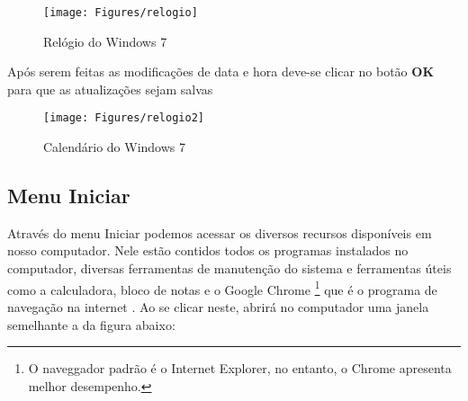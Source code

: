\documentclass[12pt]{article}
\begin{document}
	\begin{figure}[!hb]
		\centering
		\texttt{[image: Figures/relogio]}
		\caption{Relógio do Windows 7}
		\label{fig:relogio}
		
	\end{figure}
	
	Após serem feitas as modificações de data e hora deve-se clicar no botão {\bf OK} para que as atualizações sejam salvas
	
	\begin{figure}[!h]
		\centering
		\texttt{[image: Figures/relogio2]}
		\caption{Calendário do Windows 7}
		\label{fig:calendario}
		
	\end{figure}
	
	\newpage
	\subsection{Menu Iniciar}
	
	Através do menu Iniciar podemos acessar os diversos recursos disponíveis em nosso computador. Nele estão contidos todos os programas instalados no computador, diversas ferramentas de manutenção do sistema e ferramentas úteis como a calculadora, bloco de notas e o Google Chrome \footnote{O naveggador padrão é o Internet Explorer, no entanto, o Chrome apresenta melhor desempenho.} que é o programa de navegação na internet . Ao se clicar neste, abrirá no computador uma janela semelhante a da figura abaixo:
	
\end{document}

